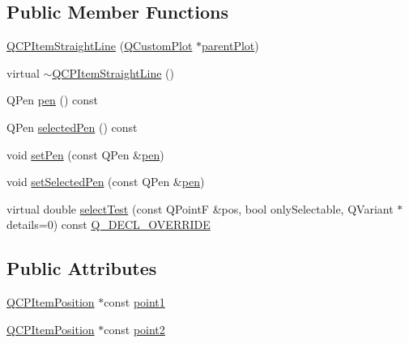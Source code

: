 \subsection*{Public Member Functions}
\begin{DoxyCompactItemize}
\item 
\mbox{\hyperlink{class_q_c_p_item_straight_line_a41fd2e1f006983449eca9830930c3b10}{Q\+C\+P\+Item\+Straight\+Line}} (\mbox{\hyperlink{class_q_custom_plot}{Q\+Custom\+Plot}} $\ast$\mbox{\hyperlink{class_q_c_p_layerable_a473edb813a4c1929d6b6a8fe3ff3faf7}{parent\+Plot}})
\item 
virtual \mbox{\hyperlink{class_q_c_p_item_straight_line_a1f0730759916ce203baeaad1ad2af3ea}{$\sim$\+Q\+C\+P\+Item\+Straight\+Line}} ()
\item 
Q\+Pen \mbox{\hyperlink{class_q_c_p_item_straight_line_aa751d46cf36073607c11508763f85ff6}{pen}} () const
\item 
Q\+Pen \mbox{\hyperlink{class_q_c_p_item_straight_line_ae4a4607045b1d0594f89eee448a31ff9}{selected\+Pen}} () const
\item 
void \mbox{\hyperlink{class_q_c_p_item_straight_line_a9f36c9c9e60d7d9ac084c80380ac8601}{set\+Pen}} (const Q\+Pen \&\mbox{\hyperlink{class_q_c_p_item_straight_line_aa751d46cf36073607c11508763f85ff6}{pen}})
\item 
void \mbox{\hyperlink{class_q_c_p_item_straight_line_a5c33559498d33543fa95cf0a36e851ff}{set\+Selected\+Pen}} (const Q\+Pen \&\mbox{\hyperlink{class_q_c_p_item_straight_line_aa751d46cf36073607c11508763f85ff6}{pen}})
\item 
virtual double \mbox{\hyperlink{class_q_c_p_item_straight_line_a2e36c9d4dcc3aeda78a5584f790e39e3}{select\+Test}} (const Q\+PointF \&pos, bool only\+Selectable, Q\+Variant $\ast$details=0) const \mbox{\hyperlink{qcustomplot_8h_a42cc5eaeb25b85f8b52d2a4b94c56f55}{Q\+\_\+\+D\+E\+C\+L\+\_\+\+O\+V\+E\+R\+R\+I\+DE}}
\end{DoxyCompactItemize}
\subsection*{Public Attributes}
\begin{DoxyCompactItemize}
\item 
\mbox{\hyperlink{class_q_c_p_item_position}{Q\+C\+P\+Item\+Position}} $\ast$const \mbox{\hyperlink{class_q_c_p_item_straight_line_ac131a6ffe456f2cc7364dce541fe0120}{point1}}
\item 
\mbox{\hyperlink{class_q_c_p_item_position}{Q\+C\+P\+Item\+Position}} $\ast$const \mbox{\hyperlink{class_q_c_p_item_straight_line_ad26c0a732e471f63f75d481dcd48cfc9}{point2}}
\end{DoxyCompactItemize}
